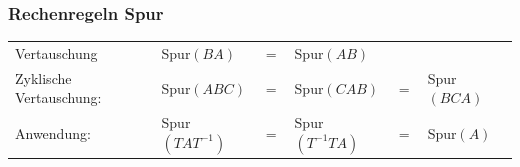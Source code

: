 \vspace{0.3cm}


\subsubsection{Rechenregeln Spur}

\begin{tabular}{llclcl}
	Vertauschung 			& Spur$(BA)$ & $=$  & Spur$(AB)$ \\
	Zyklische Vertauschung:	& Spur$(ABC)$ & $=$ & Spur$(CAB)$ &  $=$ & Spur$(BCA)$ \\
	Anwendung: 				& Spur$(TAT^{-1})$ & $=$ & Spur$(T^{-1}TA)$ & $=$ & Spur$(A)$
\end{tabular}
